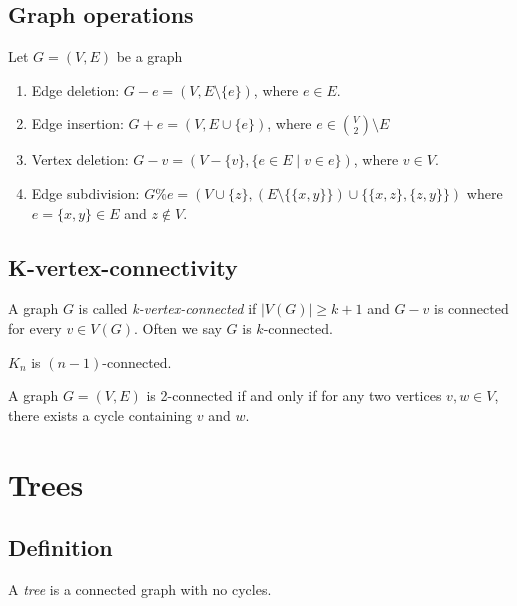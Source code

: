 \documentclass{classnotes}
\begin{document}
\subsection{Graph operations}
\begin{definition}
    Let $G=(V,E)$ be a graph
    \begin{enumerate}
        \item Edge deletion: $G-e = (V,E\setminus\{e\})$, where $e \in E$.
        \item Edge insertion: $G+e = (V,E \cup \{e\})$, where $e \in \binom{V}{2}\setminus E$
        \item Vertex deletion: $G-v = (V-\{v\},\{e \in E \mid v \in e\})$, where $v \in V$.
        \item Edge subdivision: $G\%e = (V\cup\{z\},(E \setminus \{\{x,y\}\}) \cup \{\{x,z\},\{z,y\}\})$ where $e = \{x,y\} \in E$ and $z \notin V$.
    \end{enumerate}
\end{definition}

\subsection{K-vertex-connectivity}
\begin{definition}
    A graph $G$ is called \emph{k-vertex-connected} if $|V(G)| \ge k+1$ and $G-v$ is connected for every $v \in V(G)$.
    Often we say $G$ is $k$-connected.
\end{definition}
\begin{example}
    $K_n$ is $(n-1)$-connected.
\end{example}

\begin{theorem}
    A graph $G=(V,E)$ is 2-connected if and only if for any two vertices $v,w \in V$, there exists a cycle containing $v$ and $w$. 
\end{theorem}

\section{Trees}
\subsection{Definition}
\begin{definition}[Tree]
    A \emph{tree} is a connected graph with no cycles.
\end{definition}
\end{document}

